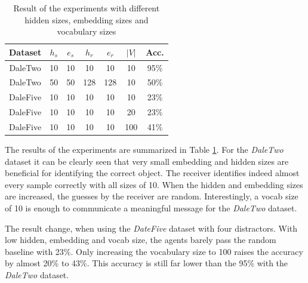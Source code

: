 \documentclass[11pt]{article}
\begin{document}
\begin{table}
  \centering
  \begin{tabular}{c|ccccc|c}
    \hline
    \textbf{Dataset} & $h_{s}$ & $e_{s}$ & $h_{r}$ & $e_{r}$ & $|V|$ & \textbf{Acc.} \\
    \hline
    DaleTwo          & {10}    & {10}    & {10}    & {10}    & {10}  & {95\%}        \\
    DaleTwo          & {50}    & {50}    & {128}   & {128}   & {10}  & {50\%}        \\
    DaleFive         & {10}    & {10}    & {10}    & {10}    & {10}  & {23\%}        \\
    DaleFive         & {10}    & {10}    & {10}    & {10}    & {20}  & {23\%}        \\
    DaleFive         & {10}    & {10}    & {10}    & {10}    & {100} & {41\%}        \\
    \hline
  \end{tabular}
  \caption{Result of the experiments with different hidden sizes, embedding sizes and vocabulary sizes}
  \label{tab:results}
\end{table}

The results of the experiments are summarized in Table \ref{tab:results}. For the \emph{DaleTwo} dataset it can be clearly seen that very small embedding and hidden sizes are beneficial for identifying the correct object. The receiver identifies indeed almost every sample correctly with all sizes of 10. When the hidden and embedding sizes are increased, the guesses by the receiver are random. Interestingly, a vocab size of 10 is enough to communicate a meaningful message for the \emph{DaleTwo} dataset.


The result change, when using the \emph{DateFive} dataset with four distractors. With low hidden, embedding and vocab size, the agents barely pass the random baseline with 23\%. Only increasing the vocabulary size to 100 raises the accuracy by almost 20\% to 43\%. This accuracy is still far lower than the 95\% with the \emph{DaleTwo} dataset.


\end{document}
